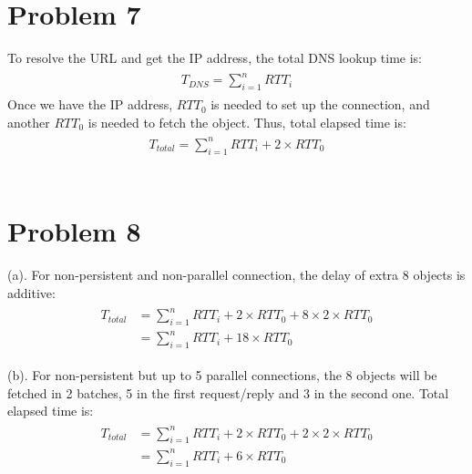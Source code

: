 \documentclass[titlepage, paper=a4, fontsize=11pt]{scrartcl} %
\numberwithin{equation}{section} %
\numberwithin{table}{section} %
\begin{document}

\section*{Problem 7}
To resolve the URL and get the IP address, the total DNS lookup time is:
\begin{align*} 
\begin{split}
T_{DNS} = \sum\limits_{i=1}^n RTT_{i} 
\end{split}					
\end{align*}
Once we have the IP address, $RTT_{0}$ is needed to set up the connection,
and another $RTT_{0}$ is needed to fetch the object. Thus, total elapsed time is:
\begin{align*} 
\begin{split}
T_{total} = \sum\limits_{i=1}^n RTT_{i} + 2 \times RTT_{0}
\end{split}					
\end{align*}
\\



\section*{Problem 8}
(a). For non-persistent and non-parallel connection, the delay of extra 8 objects is additive:
\begin{align*} 
\begin{split}
T_{total} &= \sum\limits_{i=1}^n RTT_{i} + 2 \times RTT_{0} + 8 \times 2 \times RTT_{0} \\
&= \sum\limits_{i=1}^n RTT_{i} + 18 \times RTT_{0}
\end{split}					
\end{align*}

(b). For non-persistent but up to 5 parallel connections, the 8 objects will be fetched in 2 batches,
5 in the first request/reply and 3 in the second one. Total elapsed time is:
\begin{align*} 
\begin{split}
T_{total} &= \sum\limits_{i=1}^n RTT_{i} + 2 \times RTT_{0} + 2 \times 2 \times RTT_{0} \\
&= \sum\limits_{i=1}^n RTT_{i} + 6 \times RTT_{0}
\end{split}					
\end{align*}
\end{document}
